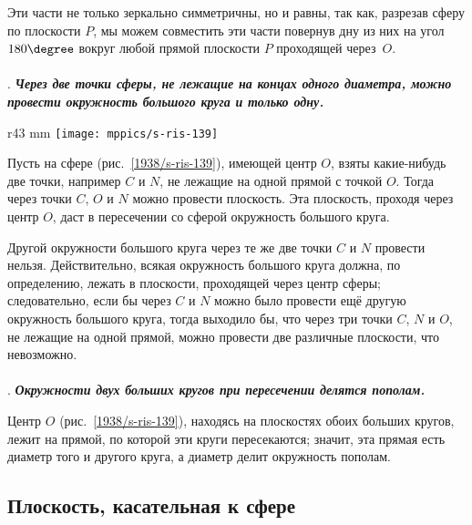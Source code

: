 Эти части не только зеркально симметричны, но и равны, так как, разрезав сферу по плоскости $P$, мы можем совместить эти части повернув дну из них на угол $180\degree$ вокруг любой прямой плоскости $P$ проходящей через~$O$.



\paragraph{}\label{1938/s129}
.
\textbf{\emph{Через две точки сферы, не лежащие на концах одного диаметра, можно провести окружность большого круга и только одну.}}

\begin{wrapfigure}{r}{43 mm}
\vskip-0mm
\centering
\texttt{[image: mppics/s-ris-139]}
\caption{}\label{1938/s-ris-139}
\vskip-0mm
\end{wrapfigure}

Пусть на сфере (рис.~\ref{1938/s-ris-139}), имеющей центр $O$, взяты какие-нибудь две точки, например $C$ и $N$, не лежащие на одной прямой с точкой $O$.
Тогда через точки $C$, $O$ и $N$ можно провести плоскость.
Эта плоскость, проходя через центр $O$, даст в пересечении со сферой окружность большого круга.

Другой окружности большого круга через те же две точки $C$ и $N$ провести нельзя.
Действительно, всякая окружность большого круга должна, по определению, лежать в плоскости, проходящей через центр сферы;
следовательно, если бы через $C$ и $N$ можно было провести ещё другую окружность большого круга, тогда выходило бы, что через три точки $C$, $N$ и $O$, не лежащие на одной прямой, можно провести две различные плоскости, что невозможно.

\paragraph{}\label{1938/s130}
.
\textbf{\emph{Окружности двух больших кругов при пересечении делятся пополам.}}

Центр $O$ (рис.~\ref{1938/s-ris-139}), находясь на плоскостях обоих больших кругов, лежит на прямой, по которой эти круги пересекаются;
значит, эта прямая есть диаметр того и другого круга, а диаметр делит окружность пополам.

\subsection*{Плоскость, касательная к сфере}

